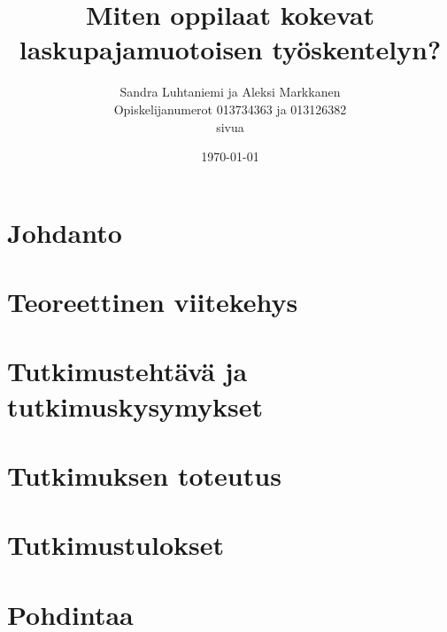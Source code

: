 \documentclass[a4paper,12pt,leqno,titlepage]{article}
\begin{document}
\begin{titlepage}
\title{Miten oppilaat kokevat laskupajamuotoisen työskentelyn?} %
\author{Sandra Luhtaniemi ja Aleksi Markkanen\\
Opiskelijanumerot 013734363 ja 013126382\\
\pageref{LastPage} sivua}
\date{\today}
\end{titlepage}
\maketitle
\pagebreak
\tableofcontents
\pagebreak

\section{Johdanto}

\pagebreak
\section{Teoreettinen viitekehys}

\pagebreak
\section{Tutkimustehtävä ja tutkimuskysymykset}

\section{Tutkimuksen toteutus}

\section{Tutkimustulokset}

\pagebreak
\section{Pohdintaa}

\pagebreak

\printbibliography
\end{document}
